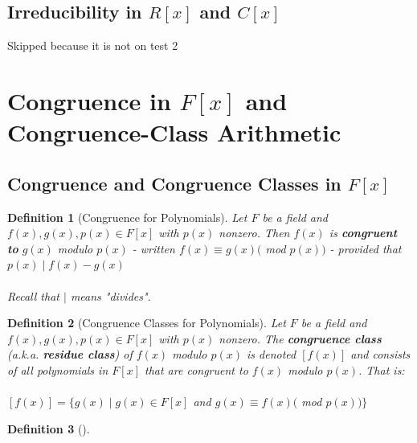 \documentclass{article}
\theoremstyle{break}
\newtheorem{definition}{Definition}[subsection]
\begin{document}
\subsection{Irreducibility in $R[x]$ and $C[x]$}
Skipped because it is not on test 2

\section{Congruence in $F[x]$ and Congruence-Class Arithmetic}

\subsection{Congruence and Congruence Classes in $F[x]$}

\begin{definition}[Congruence for Polynomials]
  Let $F$ be a field and $f(x), g(x), p(x) \in F[x]$ with $p(x)$ nonzero. Then
  $f(x)$ is \textbf{congruent to} $g(x)$ modulo $p(x)$ - written $f(x) \equiv
  g(x)($ mod $p(x))$ - provided that $p(x) \mid f(x) - g(x)$
  \\ \\ Recall that $\mid$ means "divides".
\end{definition}

\begin{definition}[Congruence Classes for Polynomials]
  Let $F$ be a field and $f(x), g(x), p(x) \in F[x]$ with $p(x)$ nonzero. The
  \textbf{congruence class} (a.k.a. \textbf{residue class}) of $f(x)$ modulo
  $p(x)$ is denoted $[f(x)]$ and consists of all polynomials in $F[x]$ that are
  congruent to $f(x)$ modulo $p(x)$. That is:
  \\ \\ $[f(x)] = \{ g(x) \mid g(x) \in F[x] $ and $ g(x) \equiv f(x) ($ mod
  $p(x)) \}$
\end{definition}

\begin{definition}[]
\end{definition}
\end{document}
